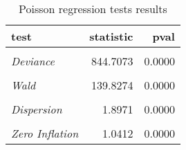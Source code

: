 \begin{table}

\caption{\label{tab:poisson_reg_tests}Poisson regression tests results}
\centering
\begin{tabular}[t]{>{}lrr}
\toprule
test & statistic & pval\\
\midrule
\em{\cellcolor{gray!6}{Pearson}} & \cellcolor{gray!6}{2279.8732} & \cellcolor{gray!6}{0.0000}\\
\em{Deviance} & 844.7073 & 0.0000\\
\em{\cellcolor{gray!6}{LR}} & \cellcolor{gray!6}{118.0931} & \cellcolor{gray!6}{0.0000}\\
\em{Wald} & 139.8274 & 0.0000\\
\em{\cellcolor{gray!6}{Bootstrap Outliers}} & \cellcolor{gray!6}{0.0031} & \cellcolor{gray!6}{0.0200}\\
\addlinespace
\em{Dispersion} & 1.8971 & 0.0000\\
\em{\cellcolor{gray!6}{K-S Uniformity}} & \cellcolor{gray!6}{0.0185} & \cellcolor{gray!6}{0.7623}\\
\em{Zero Inflation} & 1.0412 & 0.0000\\
\bottomrule
\end{tabular}
\end{table}
